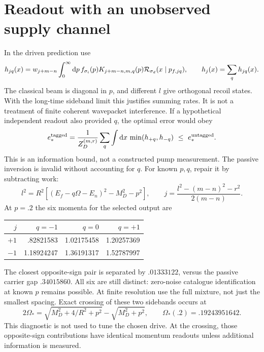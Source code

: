 \documentclass[11pt,a4paper]{article}
\newcommand{\dd}{\mathrm d}
\begin{document}
\section{Readout with an unobserved supply channel}
In the driven prediction use
\begin{equation}
 h_{jq}(x)=w_{j+m-n}\int_0^\infty\dd p\,f_{\sigma_i}(p)
 K_{j+m-n,m,q}(p){\cal R}_{\sigma_d}(x\mid p_{f,jq}),\qquad
 h_j(x)=\sum_qh_{jq}(x).
\end{equation}
The classical beam is diagonal in $p$, and different $l$ give
orthogonal recoil states. With the long-time sideband limit this
justifies summing rates. It is not a treatment of finite coherent
wavepacket interference. If a hypothetical independent readout also
provided $q$, the optimal error would obey
\begin{equation}
 e_*^{\rm tagged}=\frac1{Z_D^{(m,r)}}\sum_q
 \int\dd x\,\min(h_{+q},h_{-q})\ \leq\ e_*^{\rm untagged}.
\end{equation}
This is an information bound, not a constructed pump measurement.
The passive inversion is invalid without accounting for $q$.
For known $p,q$, repair it by subtracting work:
\begin{equation}
 l^2=R^2[(E_f-q\Omega-E_n)^2-M_D^2-p^2],\qquad
 j=\frac{l^2-(m-n)^2-r^2}{2(m-n)} .
\end{equation}
At $p=.2$ the six momenta for the selected output are
\begin{center}
\begin{tabular}{rrrr}
\toprule
$j$ & $q=-1$ & $q=0$ & $q=+1$\\
\midrule
$+1$ & .82821583 & 1.02175458 & 1.20257369\\
$-1$ & 1.18924247 & 1.36191317 & 1.52787997\\
\bottomrule
\end{tabular}
\end{center}
The closest opposite-sign pair is separated by $.01333122$,
versus the passive carrier gap $.34015860$. All six are still
distinct: zero-noise catalogue identification at known $p$ remains
possible. At finite resolution use the full mixture, not just
the smallest spacing. Exact crossing of these two sidebands occurs at
\begin{equation}
 2\Omega_*=\sqrt{M_D^2+4/R^2+p^2}-\sqrt{M_D^2+p^2},
 \qquad \Omega_*(.2)=.19243951642 .
\end{equation}
This diagnostic is not used to tune the chosen drive. At the crossing,
those opposite-sign contributions have identical momentum readouts
unless additional information is measured.
\end{document}
